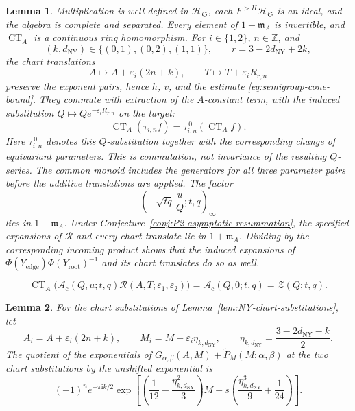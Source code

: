 \documentclass[10pt,a4paper]{amsart}
\newtheorem{lemma}{Lemma}
\newcommand{\Z}{\mathbb Z}
\newcommand{\eps}{\varepsilon}
\begin{document}
\begin{lemma}
\label{lem:completed-semigroup-support}
Multiplication is well defined in \(\mathscr H_{\mathfrak S}\), each \(F^{>H}\mathscr H_{\mathfrak S}\) is an ideal, and the algebra is complete and separated.  Every element of \(1+\mathfrak m_A\) is invertible, and \(\operatorname{CT}_A\) is a continuous ring homomorphism.  For \(i\in\{1,2\}\), \(n\in\Z\), and
\[
 (k,d_{\mathrm{NY}})\in\{(0,1),(0,2),(1,1)\},
 \qquad r=3-2d_{\mathrm{NY}}+2k,
\]
the chart translations
\[
 A\longmapsto A+\eps_i(2n+k),\qquad
 T\longmapsto T+\eps_iR_{r,n}
\]
preserve the exponent pairs, hence \(h\), \(v\), and the estimate \eqref{eq:semigroup-cone-bound}.  They commute with extraction of the \(A\)-constant term, with the induced substitution \(Q\mapsto Qe^{-\eps_iR_{r,n}}\) on the target:
\[
 \operatorname{CT}_A(\tau_{i,n}f)
 =\tau_{i,n}^{\,0}(\operatorname{CT}_A f).
\]
Here \(\tau_{i,n}^{\,0}\) denotes this \(Q\)-substitution together with the corresponding change of equivariant parameters.  This is commutation, not invariance of the resulting \(Q\)-series.  The common monoid includes the generators for all three parameter pairs before the additive translations are applied.  The factor
\[
 \left(-\sqrt{tq}\,\frac uQ;t,q\right)_\infty
\]
lies in \(1+\mathfrak m_A\).  Under Conjecture~\ref{conj:P2-asymptotic-resummation}, the specified expansions of \(\mathcal R\) and every chart translate lie in \(1+\mathfrak m_A\).  Dividing by the corresponding incoming product shows that the induced expansions of \(\Phi(Y_{\mathrm{edge}})\Phi(Y_{\mathrm{root}})^{-1}\) and its chart translates do so as well.
\end{lemma}

\begin{equation}
 \operatorname{CT}_A\bigl(
 \mathscr A_{\mathrm c}(Q,u;t,q)\mathcal R(A,T;\eps_1,\eps_2)\bigr)
 =\mathscr A_{\mathrm c}(Q,0;t,q)=\mathcal Z(Q;t,q).
\label{eq:u-zero-order-zero}
\end{equation}

\begin{lemma}
\label{lem:two-chart-factor}
For the chart substitutions of Lemma~\ref{lem:NY-chart-substitutions}, let
\begin{equation}
 A_i=A+\eps_i(2n+k),\qquad
 M_i=M+\eps_i\eta_{k,d_{\mathrm{NY}}},\qquad
 \eta_{k,d_{\mathrm{NY}}}
 =\frac{3-2d_{\mathrm{NY}}-k}{2}.
\label{eq:centered-additive-chart-data}
\end{equation}
The quotient of the exponentials of \(G_{\alpha,\beta}(A,M)+\widetilde P_M(M;\alpha,\beta)\) at the two chart substitutions by the unshifted exponential is
\begin{equation}
 (-1)^n e^{-\pi\mathrm{i}k/2}
 \exp\left[
 \left(\frac1{12}-\frac{\eta_{k,d_{\mathrm{NY}}}^2}{3}\right)M
 -s\left(\frac{\eta_{k,d_{\mathrm{NY}}}^3}{9}
          +\frac1{24}\right)\right].
\label{eq:two-chart-factor}
\end{equation}
\end{lemma}
\end{document}
